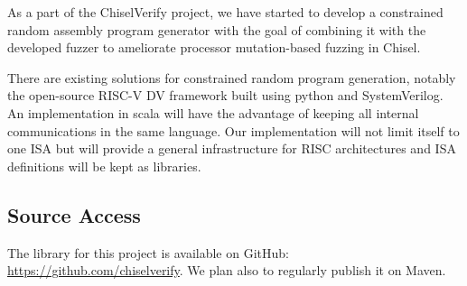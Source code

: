 \documentclass[conference]{IEEEtran}
\newcommand{\todo}[1]{{\color{olive} TODO: #1}}
\begin{document}
As a part of the ChiselVerify project, we have started to develop a constrained random assembly program generator with the goal of combining it with the developed fuzzer to ameliorate processor mutation-based fuzzing in Chisel.
%
%
%

There are existing solutions for constrained random program generation, notably the open-source RISC-V DV framework \cite{riscvdv} built using python and SystemVerilog. 
An implementation in scala will have the advantage of keeping all internal communications in the same language. 
Our implementation will not limit itself to one ISA but will provide a general infrastructure for RISC architectures and ISA definitions will be kept as libraries.

\subsection{Source Access}

The library for this project is available on GitHub:\\ \url{https://github.com/chiselverify}.
We plan also to regularly publish it on Maven.
\end{document}
